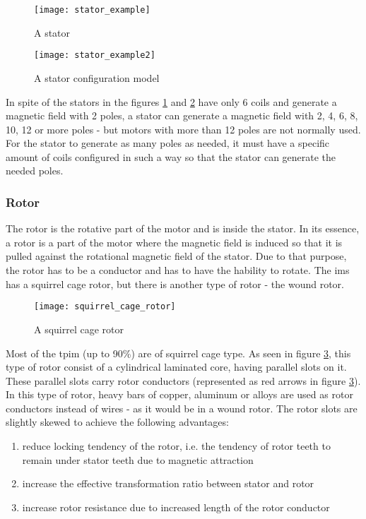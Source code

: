 \begin{figure}[htbp]
	\centering
	\texttt{[image: stator\_example]}
	\caption{A stator}
	\label{fig:stator1}
\end{figure}

\begin{figure}[htbp]
	\centering
	\texttt{[image: stator\_example2]}
	\caption{A stator configuration model}
	\label{fig:stator2}
\end{figure}

In spite of the stators in the figures \ref{fig:stator1} and \ref{fig:stator2} have only 6 coils and generate a magnetic field with 2 poles, a stator can generate a magnetic field with 2, 4, 6, 8, 10, 12 or more poles - but motors with more than 12 poles are not normally used. For the stator to generate as many poles as needed, it must have a specific amount of coils configured in such a way so that the stator can generate the needed poles.


\subsubsection{Rotor}

The rotor is the rotative part of the motor and is inside the stator. In its essence, a rotor is a part of the motor where the magnetic field is induced so that it is pulled against the rotational magnetic field of the stator. Due to that purpose, the rotor has to be a conductor and has to have the hability to rotate.
The \acrshort{ims} has a squirrel cage rotor, but there is another type of rotor - the wound rotor. 

\begin{figure}[htbp]
	\centering
	\texttt{[image: squirrel\_cage\_rotor]}
	\caption{A squirrel cage rotor}
	\label{fig:squirrel_cage_rotor}
\end{figure}

Most of the \acrshort{tpim} (up to 90\%) are of squirrel cage type.
As seen in figure \ref{fig:squirrel_cage_rotor}, this type of rotor consist of a cylindrical laminated core, having parallel slots on it. These parallel slots carry rotor conductors (represented as red arrows in figure \ref{fig:squirrel_cage_rotor}). In this type of rotor, heavy bars of copper, aluminum or alloys are used as rotor conductors instead of wires - as it would be in a wound rotor. 
The rotor slots are slightly skewed to achieve the following advantages:
\begin{enumerate}
  \item reduce locking tendency of the rotor, i.e. the tendency of rotor teeth to remain under stator teeth due to magnetic attraction
  \item increase the effective transformation ratio between stator and rotor
  \item increase rotor resistance due to increased length of the rotor conductor 
\end{enumerate}


